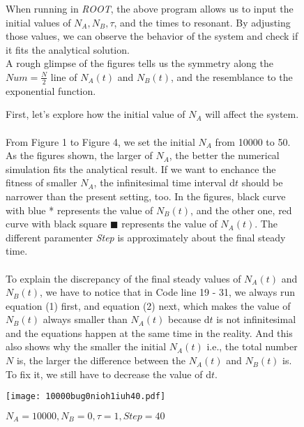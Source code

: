 \documentclass[a4paper]{article}
\begin{document}

				  \lstset{escapechar=@,style=customc}




\begin{figure}[htbp]
When running in \emph{ROOT}, the above program allows us to input the initial values of $N_A,N_B,\tau$, and the times to resonant. By adjusting those values, we can  observe the behavior of the system and check if it fits the analytical solution.\\

A rough glimpse of the figures tells us the symmetry along the $Num=\frac{N}{2}$ line of $N_A(t)$ and $N_B(t)$, and the resemblance to the exponential function.

First, let's explore how the initial value of $N_A$ will affect the system.\\\\
From Figure 1 to Figure 4, we set the initial $N_A$ from 10000 to 50. As the figures shown, the larger of $N_A$, the better the numerical simulation fits the analytical result. If we want to enchance the fitness of smaller $N_A$, the infinitesimal time interval d$t$ should be narrower than the present setting, too. In the figures, black curve with {\color{blue}blue *} represents the value of $N_B(t)$, and the other one, {\color{red}red curve} with black square $\blacksquare$ represents the value of $N_A(t)$. The different paramenter \emph{Step} is approximately about the final steady time.\\\\ To explain the discrepancy of the final steady values of $N_A(t)$ and $N_B(t)$, we have to notice that in Code line 19 - 31, we always run equation (1) first, and equation (2) next, which makes the value of $N_B(t)$ always smaller than $N_A(t)$ because d$t$ is not infinitesimal and the equations happen at the same time in the reality. And this also shows why the smaller the initial $N_A(t)$ i.e., the total number $N$ is, the larger the difference between the $N_A(t)$ and $N_B(t)$ is. To fix it, we still have to decrease the value of d$t$.

\centering
\texttt{[image: 10000bug0nioh1iuh40.pdf]}
\caption{$N_A=10000,N_B=0,\tau=1,Step=40$}
\end{figure}
\end{document}
